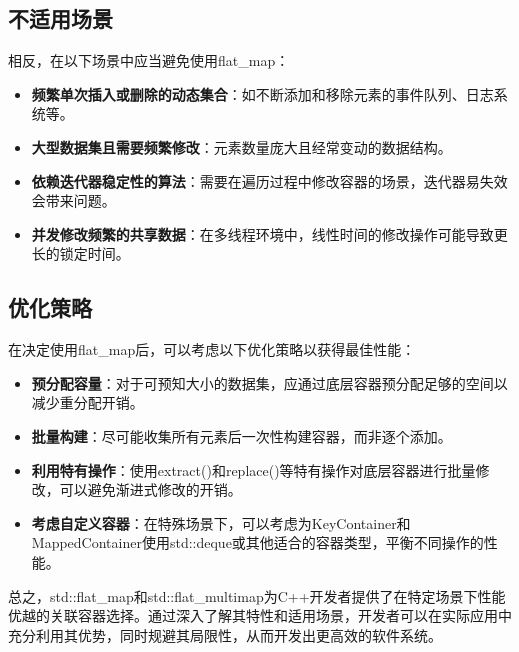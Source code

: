 \documentclass[a4paper, 12pt]{article}
\begin{document}
\subsection{不适用场景}

相反，在以下场景中应当避免使用flat\_map：

\begin{itemize}
    \setlength{\itemsep}{0pt}
    \setlength{\parsep}{0pt}
    \setlength{\parskip}{0pt}
    \item \textbf{频繁单次插入或删除的动态集合}：如不断添加和移除元素的事件队列、日志系统等。
    
    \item \textbf{大型数据集且需要频繁修改}：元素数量庞大且经常变动的数据结构。
    
    \item \textbf{依赖迭代器稳定性的算法}：需要在遍历过程中修改容器的场景，迭代器易失效会带来问题。
    
    \item \textbf{并发修改频繁的共享数据}：在多线程环境中，线性时间的修改操作可能导致更长的锁定时间。
\end{itemize}

\subsection{优化策略}

在决定使用flat\_map后，可以考虑以下优化策略以获得最佳性能：

\begin{itemize}
    \setlength{\itemsep}{0pt}
    \setlength{\parsep}{0pt}
    \setlength{\parskip}{0pt}
    \item \textbf{预分配容量}：对于可预知大小的数据集，应通过底层容器预分配足够的空间以减少重分配开销。
    
    \item \textbf{批量构建}：尽可能收集所有元素后一次性构建容器，而非逐个添加。
    
    \item \textbf{利用特有操作}：使用extract()和replace()等特有操作对底层容器进行批量修改，可以避免渐进式修改的开销。
    
    \item \textbf{考虑自定义容器}：在特殊场景下，可以考虑为KeyContainer和MappedContainer使用std::deque或其他适合的容器类型，平衡不同操作的性能。
\end{itemize}

总之，std::flat\_map和std::flat\_multimap为C++开发者提供了在特定场景下性能优越的关联容器选择。通过深入了解其特性和适用场景，开发者可以在实际应用中充分利用其优势，同时规避其局限性，从而开发出更高效的软件系统。
\end{document}
